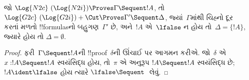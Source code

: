 \documentclass[../../../include/open-logic-section]{subfiles}
\begin{document}


\begin{prop}
જો $\Log{N2c}\ (\Log{N2i}) \Proves
\Gamma \Sequent !A$,
તો~$\Log{G2c}\ (\Log{G2i}) + \Cut \Proves \Gamma'
\Sequent \Delta$,
જ્યાં~$\Gamma$માંથી
ચિહ્નો દૂર કરતાં
મળતો !!{formula}sનો
બહુગણ~$\Gamma'$ છે,
અને~$!A$ એ~$\lfalse$
ન હોય તો~$\Delta = \{!A\}$,
જ્યારે હોય તો
$\Delta = \emptyset$.
\end{prop}

\begin{proof}
ફરી~$\Gamma \Sequent !A$ની
!!{proof}~$\delta$ની
ઊંચાઈ પર આગમન કરીએ.
જો~$\delta$ એ
$x:!A \Sequent !A$
સ્વયંસિદ્ધ હોય,
તો~$\pi$ એ અનુરૂપ
$!A \Sequent !A$
સ્વયંસિદ્ધ છે;
$!A \ident \lfalse$
હોય ત્યારે
$\lfalse \Sequent \ $
લેવું.


\end{proof}
\end{document}
